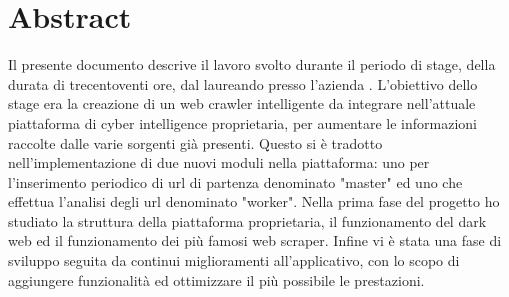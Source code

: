 
\cleardoublepage
{}
{}
\begingroup
\let\clearpage\relax
\let\cleardoublepage\relax
\let\cleardoublepage\relax

\chapter*{Abstract}

Il presente documento descrive il lavoro svolto durante il periodo di stage, della durata di trecentoventi ore, dal laureando \myName{} presso l'azienda \myCompany{} \myCompanyRag{}.
L'obiettivo dello stage era la creazione di un web crawler intelligente da integrare nell’attuale piattaforma di cyber intelligence proprietaria, per aumentare le informazioni raccolte dalle varie sorgenti già presenti. Questo si è tradotto nell'implementazione di due nuovi moduli nella piattaforma: uno per l'inserimento periodico di url di partenza denominato "master" ed uno che effettua l'analisi degli url denominato "worker". \newline{}
Nella prima fase del progetto ho studiato la struttura della piattaforma proprietaria, il funzionamento del dark web ed il funzionamento dei più famosi web scraper. Infine vi è stata una fase di sviluppo seguita da continui miglioramenti all'applicativo, con lo scopo di aggiungere funzionalità ed ottimizzare il più possibile le prestazioni.

%
%

\endgroup			

\vfill

